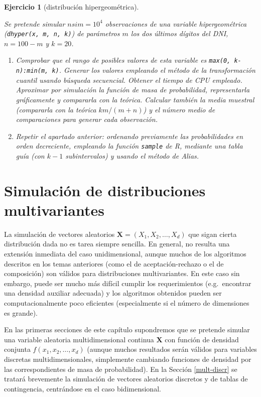 \documentclass[
]{book}
\theoremstyle{break}
\newtheorem{exercise}{Ejercicio}[chapter]
\theoremstyle{nonumberplain}
\begin{document}
\begin{exercise}[distribución hipergeométrica]
\protect\hypertarget{exr:hipergeom}{}\label{exr:hipergeom}

Se pretende simular \(nsim=10^{4}\) observaciones de una variable
hipergeométrica (\texttt{dhyper(x,\ m,\ n,\ k)}) de parámetros \(m\) los dos últimos dígitos del DNI, \(n=100-m\) y \(k=20\).

\begin{enumerate}
\def\labelenumi{\alph{enumi})}
\item
  Comprobar que el rango de posibles valores de esta variable es
  \texttt{max(0,\ k-n):min(m,\ k)}. Generar los valores empleando el método
  de la transformación cuantil usando búsqueda secuencial. Obtener
  el tiempo de CPU empleado. Aproximar por simulación la función
  de masa de probabilidad, representarla gráficamente y compararla
  con la teórica. Calcular también la media muestral (compararla
  con la teórica \(km/(m+n)\)) y el número medio de comparaciones
  para generar cada observación.
\item
  Repetir el apartado anterior: ordenando previamente las
  probabilidades en orden decreciente, empleando la
  función \texttt{sample} de R, mediante una tabla guía (con
  \(k-1\) subintervalos) y usando el método de Alias.
\end{enumerate}

\end{exercise}

\hypertarget{multivariante}{%
\chapter{Simulación de distribuciones multivariantes}\label{multivariante}}

La simulación de vectores aleatorios \(\mathbf{X} =\left( X_1, X_2, \ldots, X_d\right)\) que sigan cierta distribución dada no es tarea siempre sencilla.
En general, no resulta una extensión inmediata del caso unidimensional, aunque muchos de los algoritmos descritos en los temas anteriores (como el de aceptación-rechazo o el de composición) son válidos para distribuciones multivariantes.
En este caso sin embargo, puede ser mucho más difícil cumplir los requerimientos (e.g.~encontrar una densidad auxiliar adecuada) y los algoritmos obtenidos pueden ser computacionalmente poco eficientes (especialmente si el número de dimensiones es grande).

En las primeras secciones de este capítulo supondremos que se pretende simular una variable aleatoria multidimensional continua \(\mathbf{X}\) con función de densidad conjunta \(f\left( x_1, x_2, \ldots , x_d\right)\) (aunque muchos resultados serán válidos para variables discretas multidimensionales, simplemente cambiando funciones de densidad por las correspondientes de masa de probabilidad).
En la Sección \ref{mult-discr} se tratará brevemente la simulación de vectores aleatorios discretos y de tablas de contingencia, centrándose en el caso bidimensional.
\end{document}
